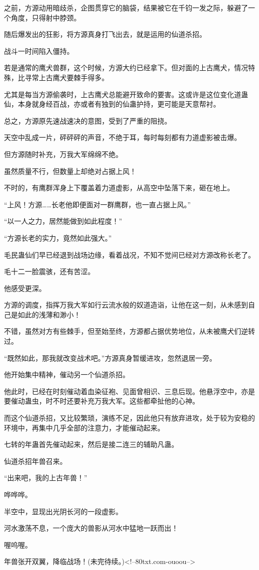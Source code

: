 \begin{this_body}
之前，方源动用暗歧杀，企图贯穿它的脑袋，结果被它在千钧一发之际，躲避了一个角度，只得射中脖颈。

随后爆发出的狂影，将方源真身打飞出去，就是运用的仙道杀招。

战斗一时间陷入僵持。

若是通常的鹰犬兽群，这个时候，方源大约已经拿下。但对面的上古鹰犬，情况特殊，比寻常上古鹰犬要棘手得多。

尤其是每当方源偷袭时，上古鹰犬总能避开致命的要害。这或许是这位变化道蛊仙，本身就身经百战，亦或者有独到的仙蛊护持，更可能是天意帮衬。

总之，方源原先速战速决的意图，受到了严重的阻挠。

天空中乱成一片，砰砰砰的声音，不绝于耳，每时每刻都有力道虚影被击爆。

但方源随时补充，万我大军绵绵不绝。

虽然质量不行，但数量上却绝对占据上风！

不时的，有鹰群浑身上下覆盖着力道虚影，从高空中坠落下来，砸在地上。

“上风！方源……长老他即便面对一群鹰群，也一直占据上风。”

“以一人之力，居然能做到如此程度！”

“方源长老的实力，竟然如此强大。”

毛民蛊仙们早已经退到战场边缘，看着战况，不知不觉间已经对方源改称长老了。

毛十二一脸震骇，还有苦涩。

他感受更深。

方源的调度，指挥万我大军如行云流水般的奴道造诣，让他在这一刻，从未感到自己是如此的浅薄和渺小！

不错，虽然对方有些棘手，但至始至终，方源都占据优势地位，从未被鹰犬们逆转过。

“既然如此，那我就改变战术吧。”方源真身暂缓进攻，忽然退居一旁。

他开始集中精神，催动另一个仙道杀招。

他此时，已经在时刻催动着血染征袍、见面曾相识、三息后现。他悬浮空中，亦是要催动蛊虫，时不时还要补充万我大军。这些都牵扯他的心神。

而这个仙道杀招，又比较繁琐，演练不足，因此他只有放弃进攻，处于较为安稳的环境中，再集中几乎全部的注意力，才能催动起来。

七转的年蛊首先催动起来，然后是接二连三的辅助凡蛊。

仙道杀招年兽召来。

“出来吧，我的上古年兽！”

哗哗哗。

半空中，显现出光阴长河的一段虚影。

河水激荡不息，一个庞大的兽影从河水中猛地一跃而出！

喔呜喔。

年兽张开双翼，降临战场！(未完待续。)<!--80txt.com-ouoou-->

\end{this_body}

